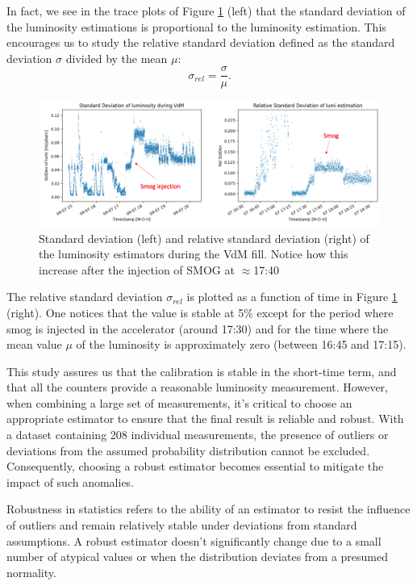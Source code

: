 In fact, we see in the trace plots of Figure \ref{fig:std_dev_rel_std} (left) that the standard deviation of the luminosity estimations is proportional to the luminosity estimation. This encourages us to study the relative standard deviation defined as the standard deviation $\sigma$  divided by the mean $\mu$:
\begin{equation}
    \sigma_{rel} = \frac{\sigma}{\mu} \label{rel_std}.
\end{equation}


\begin{figure}
    \centering
    \includegraphics[width=\textwidth]{figures/std_dev_and_rel_std.png}
    \caption{Standard deviation (left) and relative standard deviation (right) of the luminosity estimators during the VdM fill. Notice how this increase after the injection of SMOG at $\approx$17:40}
    \label{fig:std_dev_rel_std}
\end{figure}


The relative standard deviation $\sigma_{rel}$ is plotted as a function of time in Figure \ref{fig:std_dev_rel_std} (right). One notices that the value is stable at 5\% except for the period where smog is injected in the accelerator (around 17:30) and for the time where the mean value $\mu$ of the luminosity is approximately zero (between 16:45 and 17:15).  

This study assures us that the calibration is stable in the short-time term, and that all the counters provide a reasonable luminosity measurement. However, when combining a large set of measurements, it's critical to choose an appropriate estimator to ensure that the final result is reliable and robust. With a dataset containing 208 individual measurements, the presence of outliers or deviations from the assumed probability distribution cannot be excluded. Consequently, choosing a robust estimator becomes essential to mitigate the impact of such anomalies.

Robustness in statistics refers to the ability of an estimator to resist the influence of outliers and remain relatively stable under deviations from standard assumptions. A robust estimator doesn't significantly change due to a small number of atypical values or when the distribution deviates from a presumed normality.

